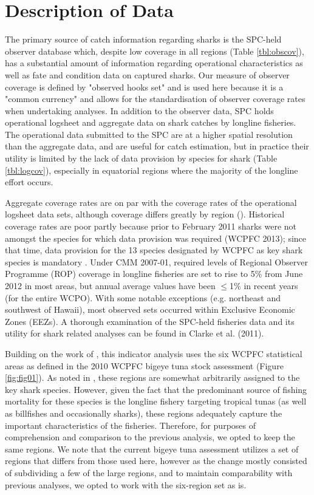 \documentclass[12pt]{SCreport}
\begin{document}
\section{Description of Data}

The primary source of catch information regarding sharks is the SPC-held observer database which, despite low coverage in all regions (Table \ref{tbl:obscov}), has a substantial amount of information regarding operational characteristics as well as fate and condition data on captured sharks. Our measure of observer coverage is defined by "observed hooks set" and is used here because it is a "common currency" and allows for the standardisation of observer coverage rates when undertaking analyses.  In addition to the observer data, SPC holds operational logsheet and aggregate data on shark catches by longline fisheries. The operational data submitted to the SPC are at a higher spatial resolution than the aggregate data, and are useful for catch estimation, but in practice their utility is limited by the lack of data provision by species for shark (Table \ref{tbl:logcov}), especially in equatorial regions where the majority of the longline effort occurs. 

Aggregate coverage rates are on par with the coverage rates of the operational logsheet data sets, although coverage differs greatly by region (). Historical coverage rates are poor partly because prior to February 2011 sharks were not amongst the species for which data provision was required (WCPFC 2013); since that time, data provision for the 13 species designated by WCPFC as key shark species is mandatory . Under CMM 2007-01, required levels of Regional Observer Programme (ROP) coverage in longline fisheries are set to rise to 5\% from June 2012 in most areas, but annual average values have been $\leq$1\% in recent years (for the entire WCPO). With some notable exceptions (e.g. northeast and southwest of Hawaii), most observed sets occurred within Exclusive Economic Zones (EEZs). A thorough examination of the SPC-held fisheries data and its utility for shark related analyses can be found in Clarke et al. (2011).

Building on the work of \citet{Clarke2011_a}, this indicator analysis uses the six WCPFC statistical areas as defined in the 2010 WCPFC bigeye tuna stock assessment (Figure \ref{fig:fig01}). As noted in \citet{Clarke2011_a}, these regions are somewhat arbitrarily assigned to the key shark species. However, given the fact that the predominant source of fishing mortality for these species is the longline fishery targeting tropical tunas (as well as billfishes and occasionally sharks), these regions adequately capture the important characteristics of the fisheries. Therefore, for purposes of comprehension and comparison to the previous analysis, we opted to keep the same regions. We note that the current bigeye tuna assessment utilizes a set of regions that differs from those used here, however as the change mostly consisted of subdividing a few of the large regions, and to maintain comparability with previous analyses, we opted to work with the six-region set as is.
\end{document}
